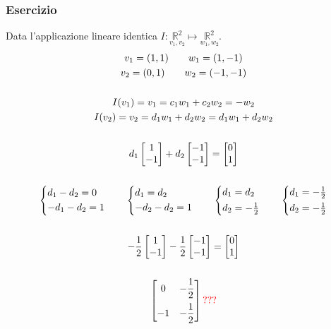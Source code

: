 \documentclass[italian]{article}
\newcommand{\ins}[1]{\text{$\mathbb{#1}$}}
\begin{document}
\subsubsection{Esercizio}
Data l'applicazione lineare identica $I: \underset{v_1,v_2}{\ins{R}^2} \longmapsto \underset{w_1,w_2}{\ins{R}^2}$.
\begin{gather*}
	v_1 = (1,1) \qquad w_1 = (1,-1)\\
	v_2 = (0,1) \qquad w_2 = (-1,-1)\\\\
	I(v_1) = v_1 = c_1w_1 + c_2w_2 = -w_2 \\
	I(v_2) = v_2 = d_1w_1 + d_2w_2 = d_1w_1 + d_2w_2 \\\\
	d_1\begin{bmatrix}1\\-1\end{bmatrix} + d_2\begin{bmatrix}-1\\-1\end{bmatrix} = \begin{bmatrix}0\\1\end{bmatrix} \\\\
	\begin{cases*}
		d_1 - d_2 = 0 \\
		-d_1 - d_2 = 1
	\end{cases*}
	\qquad\begin{cases*}
		d_1 = d_2 \\
		-d_2 - d_2 = 1
	\end{cases*}
	\qquad
	\begin{cases*}
		d_1 = d_2 \\
		d_2 = - \frac{1}{2}
	\end{cases*}
	\qquad
	\begin{cases*}
		d_1 = - \frac{1}{2} \\
		d_2 = - \frac{1}{2}
	\end{cases*} \\\\
	-\frac{1}{2} \begin{bmatrix}1\\-1\end{bmatrix} -\frac{1}{2}\begin{bmatrix}-1\\-1\end{bmatrix} =
	\begin{bmatrix}0\\1\end{bmatrix} \\\\
	\begin{bmatrix}0 & -\dfrac{1}{2} \\[3mm] -1 & -\dfrac{1}{2}\end{bmatrix} \textcolor{red}{???}
\end{gather*}
\end{document}
